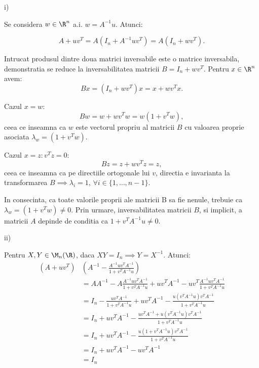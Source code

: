 \begin{demonstratie}

    \noindent i)

    Se considera $ w \in \R^{n}$ a.i. $ w = A^{-1} u$. Atunci:

    $$
    A + u v^{T} = A (I_n + A^{-1} u v^{T}) = A(I_n + w v^{T}).
    $$

    Intrucat produsul dintre doua matrici inversabile este o matrice inversabila, demonstratia se reduce la inversabilitatea matricii $ B = I_n + w v^{T}$. Pentru $ x \in \R^{n}$ avem:
    $$
    B x = (I_n + w v^{T}) x = x + w v^{T} x.
    $$

    Cazul $ x = w $:
    $$
    B w = w + w v^{T} w = w(1 + v^{T} w),
    $$
    ceea ce inseamna ca $ w $ este vectorul propriu al matricii $ B $ cu valoarea proprie asociata $\lambda_w = (1 + v^{T} w)$.

    Cazul $ x = z : v^{T} z = 0 $:
    $$
    B z = z + w v^{T} z = z,
    $$
    ceea ce inseamna ca pe directiile ortogonale lui $ v $, directia e invarianta la transformarea $ B \implies \lambda_i = 1 $, $ \forall i \in \{1, \dots, n - 1\}$.

    In consecinta, ca toate valorile proprii ale matricii B sa fie nenule, trebuie ca $ \lambda_w = (1 + v^{T} w) \neq 0 $. Prin urmare, inversabilitatea matricii $ B $, si implicit, a matricii $ A $ depinde de conditia ca $1 + v^T A^{-1} u \neq 0$. 

    \bigskip

    \noindent ii)

    Pentru $ X , Y \in \M_n(\R) $, daca $ X Y = I_n \implies Y = X^{-1} $. Atunci: 
    \begin{align*}
        (A + uv^T) & \left( A^{-1} - \frac{A^{-1}uv^TA^{-1}}{1 + v^TA^{-1}u} \right) \\
        &= AA^{-1} - A \frac{A^{-1}uv^TA^{-1}}{1 + v^TA^{-1}u} + uv^TA^{-1} - uv^T \frac{A^{-1}uv^TA^{-1}}{1 + v^TA^{-1}u} \\
        &= I_n - \frac{uv^TA^{-1}}{1 + v^TA^{-1}u} + uv^TA^{-1} - \frac{u(v^TA^{-1}u)v^TA^{-1}}{1 + v^TA^{-1}u} \\
        &= I_n + uv^TA^{-1} - \frac{uv^TA^{-1} + u(v^TA^{-1}u)v^TA^{-1}}{1 + v^TA^{-1}u} \\
        &= I_n + uv^TA^{-1} - \frac{u \left( 1 + v^TA^{-1}u \right) v^TA^{-1}}{1 + v^TA^{-1}u} \\
        &= I_n + uv^TA^{-1} - uv^TA^{-1} \\
        &= I_n
    \end{align*}
\end{demonstratie}